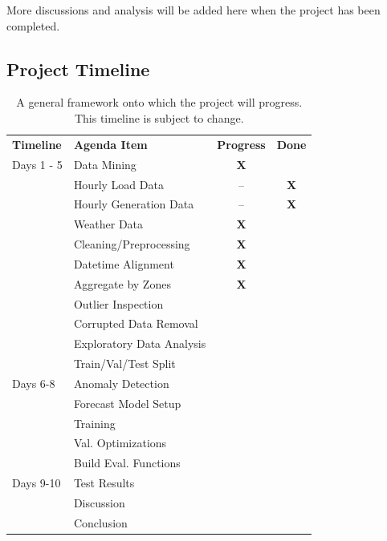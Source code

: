 \documentclass[sigconf]{acmart}
\begin{document}
More discussions and analysis will be added here when the project has been completed.

\subsection{Project Timeline}

\begin{table}[hbt!]
\centering
\caption{A general framework onto which the project will progress. This timeline is subject to change.}
\begin{tabular}{ll | c | c}
\toprule
\textbf{Timeline} & \textbf{Agenda Item} & \hfil \textbf{Progress} & \hfil \textbf{Done} \\
\cmidrule(rl){1-1}\cmidrule(rl){2-2}\cmidrule(rl){3-3}\cmidrule(rl){4-4}
  Days 1 - 5 & Data Mining & \textbf{X} & \\
  \cmidrule(rl){1-4}
   & \hspace{3mm}Hourly Load Data & -- & \textbf{X} \\   
   & \hspace{3mm}Hourly Generation Data & -- & \textbf{X} \\   
   & \hspace{3mm}Weather Data & \textbf{X} & \\   
   & Cleaning/Preprocessing & \textbf{X} & \\  
   \cmidrule(rl){2-4} 
   & \hspace{3mm}Datetime Alignment & \textbf{X} & \\   
   & \hspace{3mm}Aggregate by Zones & \textbf{X} & \\   
   & \hspace{3mm}Outlier Inspection & & \\   
   & \hspace{3mm}Corrupted Data Removal & & \\  
   & Exploratory Data Analysis & & \\  
   \cmidrule(rl){2-4} 
   & Train/Val/Test Split & & \\  
   \cmidrule(rl){2-4} 
  Days 6-8 & Anomaly Detection & & \\  
   \cmidrule(rl){1-4} 
   & Forecast Model Setup & & \\  
   \cmidrule(rl){2-4} 
   & \hspace{3mm}Training & & \\  
   & \hspace{3mm}Val. Optimizations & & \\  
   & Build Eval. Functions & & \\  
   \cmidrule(rl){2-4} 
  Days 9-10 & Test Results & & \\  
  \cmidrule(rl){1-4} 
   & Discussion & & \\
   \cmidrule(rl){2-4}   
   & Conclusion & & \\  
   \cmidrule(rl){2-4} 
  \bottomrule
\end{tabular}
\end{table}
\end{document}
